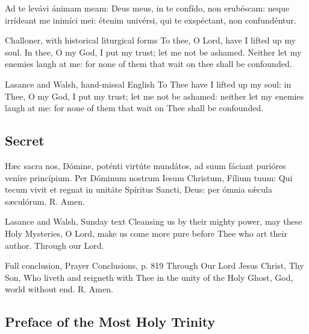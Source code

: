 \begin{latinproper}
Ad te levávi ánimam meam: Deus meus, in te confído, non erubéscam: neque irrídeant me inimíci mei: étenim univérsi, qui te exspéctant, non confundéntur.
\end{latinproper}

\begin{englishwitness}{Challoner, with historical liturgical forms}
To thee, O Lord, have I lifted up my soul. In thee, O my God, I put my trust; let me not be ashamed. Neither let my enemies laugh at me: for none of them that wait on thee shall be confounded.
\end{englishwitness}

\begin{englishwitness}{Lasance and Walsh, hand-missal English}
To Thee have I lifted up my soul: in Thee, O my God, I put my trust; let me not be ashamed: neither let my enemies laugh at me: for none of them that wait on Thee shall be confounded.
\end{englishwitness}

\subsection{Secret}
\label{proper-secret}

\begin{latinproper}
Hæc sacra nos, Dómine, poténti virtúte mundátos, ad suum fáciant purióres veníre princípium. Per Dóminum nostrum Iesum Christum, Fílium tuum: Qui tecum vivit et regnat in unitáte Spíritus Sancti, Deus: per ómnia sǽcula sæculórum. R. Amen.
\end{latinproper}

\begin{englishwitness}{Lasance and Walsh, Sunday text}
Cleansing us by their mighty power, may these Holy Mysteries, O Lord, make us come more pure before Thee who art their author. Through our Lord.
\end{englishwitness}

\begin{englishwitness}{Full conclusion, Prayer Conclusions, p. 819}
Through Our Lord Jesus Christ, Thy Son, Who liveth and reigneth with Thee in the unity of the Holy Ghost, God, world without end. R. Amen.
\end{englishwitness}

\subsection{Preface of the Most Holy Trinity}
\label{proper-preface}

